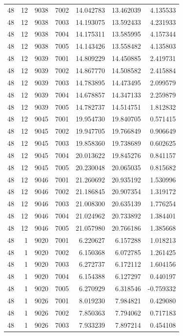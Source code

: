 \begin{table}
\begin{tabular}{rrrrrrr}
48 & 12 & 9038 & 7002 & 14.042783 & 13.462039 & 4.135533 \\
48 & 12 & 9038 & 7003 & 14.193075 & 13.592433 & 4.231933 \\
48 & 12 & 9038 & 7004 & 14.175311 & 13.585995 & 4.157344 \\
48 & 12 & 9038 & 7005 & 14.143426 & 13.558482 & 4.135803 \\
48 & 12 & 9039 & 7001 & 14.809229 & 14.450885 & 2.419731 \\
48 & 12 & 9039 & 7002 & 14.867770 & 14.508582 & 2.415884 \\
48 & 12 & 9039 & 7003 & 14.783895 & 14.473495 & 2.099579 \\
48 & 12 & 9039 & 7004 & 14.678857 & 14.347133 & 2.259879 \\
48 & 12 & 9039 & 7005 & 14.782737 & 14.514751 & 1.812832 \\
48 & 12 & 9045 & 7001 & 19.954730 & 19.840705 & 0.571415 \\
48 & 12 & 9045 & 7002 & 19.947705 & 19.766849 & 0.906649 \\
48 & 12 & 9045 & 7003 & 19.858360 & 19.738689 & 0.602625 \\
48 & 12 & 9045 & 7004 & 20.013622 & 19.845276 & 0.841157 \\
48 & 12 & 9045 & 7005 & 20.230048 & 20.065035 & 0.815682 \\
48 & 12 & 9046 & 7001 & 21.260692 & 20.935192 & 1.530996 \\
48 & 12 & 9046 & 7002 & 21.186845 & 20.907354 & 1.319172 \\
48 & 12 & 9046 & 7003 & 21.008300 & 20.635139 & 1.776254 \\
48 & 12 & 9046 & 7004 & 21.024962 & 20.733892 & 1.384401 \\
48 & 12 & 9046 & 7005 & 21.057980 & 20.766186 & 1.385668 \\
48 & 1 & 9020 & 7001 & 6.220627 & 6.157288 & 1.018213 \\
48 & 1 & 9020 & 7002 & 6.150368 & 6.072785 & 1.261425 \\
48 & 1 & 9020 & 7003 & 6.272737 & 6.172112 & 1.604156 \\
48 & 1 & 9020 & 7004 & 6.154388 & 6.127297 & 0.440197 \\
48 & 1 & 9020 & 7005 & 6.270929 & 6.318546 & -0.759332 \\
48 & 1 & 9026 & 7001 & 8.019230 & 7.984821 & 0.429080 \\
48 & 1 & 9026 & 7002 & 7.850363 & 7.794062 & 0.717183 \\
48 & 1 & 9026 & 7003 & 7.933239 & 7.897214 & 0.454108 \\

\end{tabular}
\end{table}
